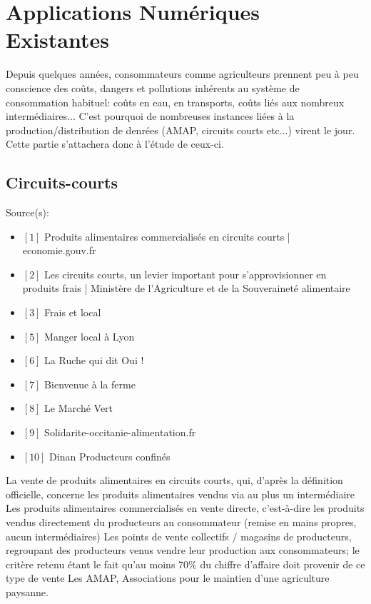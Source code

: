 \chapter*{Applications Numériques Existantes}

Depuis quelques années, consommateurs comme agriculteurs prennent peu à peu conscience des coûts, dangers et pollutions inhérents au système de consommation habituel: coûts en eau, en transports, coûts liés aux nombreux intermédiaires...
C'est pourquoi de nombreuses instances liées à la production/distribution de denrées (AMAP, circuits courts etc...) virent le jour. Cette partie s'attachera donc à l'étude de ceux-ci.



\section*{Circuits-courts}

Source(s): \begin{itemize}
	\item $[1]$ Produits alimentaires commercialisés en circuits courts | economie.gouv.fr
	\item $[2]$ Les circuits courts, un levier important pour s’approvisionner en produits frais | Ministère de l'Agriculture et de la Souveraineté alimentaire
	\item $[3]$ Frais et local
	\item $[5]$ Manger local à Lyon
	\item $[6]$ La Ruche qui dit Oui !
	\item $[7]$ Bienvenue à la ferme
	\item $[8]$ Le Marché Vert
	\item $[9]$ Solidarite-occitanie-alimentation.fr
	\item $[10]$ Dinan Producteurs confinés
	\end{itemize}

La vente de produits alimentaires en circuits courts, qui, d’après la définition officielle, concerne les produits alimentaires vendus via au plus un intermédiaire
Les produits alimentaires commercialisés en vente directe, c’est-à-dire les produits vendus directement du producteurs au consommateur (remise en mains propres, aucun intermédiaires)
Les points de vente collectifs / magasins de producteurs, regroupant des producteurs venus vendre leur production aux consommateurs; le critère retenu étant le fait qu’au moins 70\% du chiffre d’affaire doit provenir de ce type de vente
Les AMAP, Associations pour le maintien d’une agriculture paysanne.

